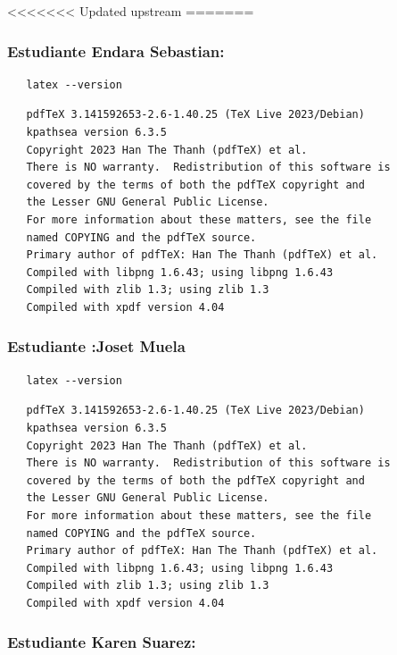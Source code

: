 \documentclass{article}
\begin{document}
<<<<<<< Updated upstream
=======
\subsubsection{Estudiante Endara Sebastian:}
\label{sec:org53e45ae}

\begin{verbatim}
   latex --version
\end{verbatim}

\begin{verbatim}
   pdfTeX 3.141592653-2.6-1.40.25 (TeX Live 2023/Debian)
   kpathsea version 6.3.5
   Copyright 2023 Han The Thanh (pdfTeX) et al.
   There is NO warranty.  Redistribution of this software is
   covered by the terms of both the pdfTeX copyright and
   the Lesser GNU General Public License.
   For more information about these matters, see the file
   named COPYING and the pdfTeX source.
   Primary author of pdfTeX: Han The Thanh (pdfTeX) et al.
   Compiled with libpng 1.6.43; using libpng 1.6.43
   Compiled with zlib 1.3; using zlib 1.3
   Compiled with xpdf version 4.04
\end{verbatim}

\subsubsection{Estudiante :Joset Muela}
\label{sec:org55d8001}

\begin{verbatim}
   latex --version
\end{verbatim}

\begin{verbatim}
   pdfTeX 3.141592653-2.6-1.40.25 (TeX Live 2023/Debian)
   kpathsea version 6.3.5
   Copyright 2023 Han The Thanh (pdfTeX) et al.
   There is NO warranty.  Redistribution of this software is
   covered by the terms of both the pdfTeX copyright and
   the Lesser GNU General Public License.
   For more information about these matters, see the file
   named COPYING and the pdfTeX source.
   Primary author of pdfTeX: Han The Thanh (pdfTeX) et al.
   Compiled with libpng 1.6.43; using libpng 1.6.43
   Compiled with zlib 1.3; using zlib 1.3
   Compiled with xpdf version 4.04
\end{verbatim}

\subsubsection{Estudiante Karen Suarez:}
\label{sec:orge438c89}
\end{document}
